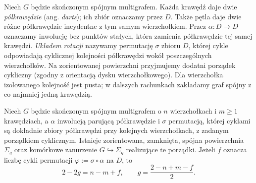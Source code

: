 \begin{definicja}
Niech $G$ będzie skończonym spójnym multigrafem. Każda
krawędź daje dwie \emph{półkrawędzie} (ang. \emph{darts});
ich zbiór oznaczamy przez $D$. Także pętla daje dwie
różne półkrawędzie incydentne z tym samym wierzchołkiem.
Przez $\alpha:D\to D$ oznaczamy inwolucję bez punktów stałych,
która zamienia półkrawędzie tej samej krawędzi.
\emph{Układem rotacji} nazywamy permutację $\sigma$ zbioru $D$,
której cykle odpowiadają cyklicznej kolejności półkrawędzi
wokół poszczególnych wierzchołków. Na zorientowanej
powierzchni przyjmujemy dodatni porządek cykliczny
(zgodny z orientacją dysku wierzchołkowego).
Dla wierzchołka izolowanego kolejność jest pusta; w dalszych rachunkach
zakładamy graf spójny z co najmniej jedną krawędzią.
\end{definicja}

\begin{twierdzenie}
\label{thm:tg-rotation-genus}
Niech $G$ będzie skończonym spójnym multigrafem o $n$
wierzchołkach i $m\ge1$ krawędziach, a $\alpha$ inwolucją parującą półkrawędzie i $\sigma$
permutacją, której cyklami są dokładnie zbiory półkrawędzi
przy kolejnych wierzchołkach, z zadanym porządkiem cyklicznym. Istnieje zorientowana, zamknięta,
spójna powierzchnia $\Sigma_g$ oraz komórkowe zanurzenie
$G\hookrightarrow\Sigma_g$ realizujące te porządki.
Jeżeli $f$ oznacza liczbę cykli permutacji
$\varphi:=\sigma\circ\alpha$ na $D$, to
\[
 2-2g=n-m+f,
 \qquad g=\frac{2-n+m-f}{2}.
\]
\end{twierdzenie}

